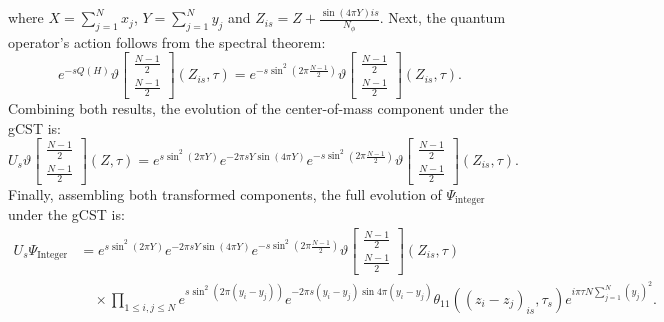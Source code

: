 \documentclass[a4paper,11pt]{article}
\begin{document}
where $X=\sum_{j=1}^{N}x_{j}$, $Y=\sum_{j=1}^{N}y_{j}$ and $Z_{is}=Z+\frac{\sin{(4\pi Y)}is}{N_{\phi}}$. Next, the quantum operator's action follows from the spectral theorem:
\begin{equation*}
e^{-sQ(H)}\vartheta\begin{bmatrix}
\frac{N-1}{2}\\
\frac{N-1}{2}
\end{bmatrix}(Z_{is},\tau) = e^{-s\sin^2{\left(2\pi\frac{N-1}{2}\right)}}\vartheta\begin{bmatrix}
\frac{N-1}{2}\\
\frac{N-1}{2}
\end{bmatrix}(Z_{is},\tau).
\end{equation*}
Combining both results, the evolution of the center-of-mass component under the gCST is:
\begin{equation*}
U_{s}\vartheta\begin{bmatrix}
\frac{N-1}{2}\\
\frac{N-1}{2}
\end{bmatrix}(Z,\tau) = e^{s\sin^2{(2\pi Y)}}e^{-2\pi s Y\sin{(4\pi Y)}}e^{-s\sin^2{\left(2\pi\frac{N-1}{2}\right)}}\vartheta\begin{bmatrix}
\frac{N-1}{2}\\
\frac{N-1}{2}
\end{bmatrix}(Z_{is},\tau).
\end{equation*}
Finally, assembling both transformed components, the full evolution of $\Psi_{\mathrm{integer}}$ under the gCST is:
\begin{align*}
U_{s}\Psi_{\mathrm{Integer}} &= e^{s\sin^2{(2\pi Y)}}e^{-2\pi s Y\sin{(4\pi Y)}}e^{-s\sin^2{\left(2\pi\frac{N-1}{2}\right)}}\vartheta\begin{bmatrix}
\frac{N-1}{2}\\
\frac{N-1}{2}
\end{bmatrix}(Z_{is},\tau) \\
&\quad \times \prod_{1\leq i,j\leq N}e^{s\sin^2{(2\pi(y_{i}-y_{j}))}}e^{-2\pi s(y_{i}-y_{j})\sin{4\pi(y_{i}-y_{j})}}\theta_{11}((z_{i}-z_{j})_{is},\tau_s)e^{i\pi \tau N\sum_{j=1}^{N}(y_{j})^2}.
\end{align*}
\end{document}
